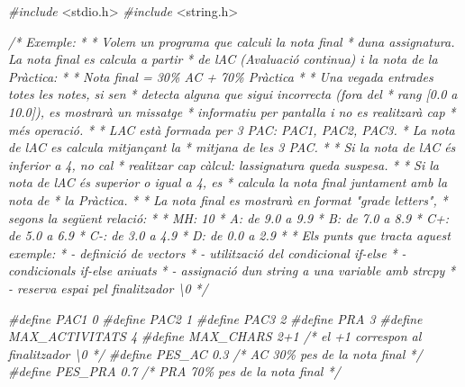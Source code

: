 \documentclass[]{book}
\newenvironment{Shaded}{\begin{snugshade}}{\end{snugshade}}
\newcommand{\CommentTok}[1]{\textcolor[rgb]{0.56,0.35,0.01}{\textit{#1}}}
\newcommand{\ImportTok}[1]{#1}
\newcommand{\PreprocessorTok}[1]{\textcolor[rgb]{0.56,0.35,0.01}{\textit{#1}}}
\begin{document}
\begin{Shaded}
\begin{Highlighting}[]
\PreprocessorTok{\#include }\ImportTok{\textless{}stdio.h\textgreater{}}
\PreprocessorTok{\#include }\ImportTok{\textless{}string.h\textgreater{}}

\CommentTok{/* Exemple:}
\CommentTok{ *}
\CommentTok{ * Volem un programa que calculi la nota final}
\CommentTok{ * d\textquotesingle{}una assignatura. La nota final es calcula a partir}
\CommentTok{ * de l\textquotesingle{}AC (Avaluació continua) i la nota de la Pràctica:}
\CommentTok{ *}
\CommentTok{ * Nota final = 30\% AC + 70\% Pràctica}
\CommentTok{ *}
\CommentTok{ * Una vegada entrades totes les notes, si se\textquotesingle{}n}
\CommentTok{ * detecta alguna que sigui incorrecta (fora del}
\CommentTok{ * rang [0.0 a 10.0]), es mostrarà un missatge}
\CommentTok{ * informatiu per pantalla i no es realitzarà cap }
\CommentTok{ * més operació.}
\CommentTok{ *}
\CommentTok{ * L\textquotesingle{}AC està formada per 3 PAC: PAC1, PAC2, PAC3. }
\CommentTok{ * La nota de l\textquotesingle{}AC es calcula mitjançant la }
\CommentTok{ * mitjana de les 3 PAC.}
\CommentTok{ *}
\CommentTok{ * Si la nota de l\textquotesingle{}AC és inferior a 4, no cal }
\CommentTok{ * realitzar cap càlcul: l\textquotesingle{}assignatura queda suspesa.}
\CommentTok{ *}
\CommentTok{ * Si la nota de l\textquotesingle{}AC és superior o igual a 4, es }
\CommentTok{ * calcula la nota final juntament amb la nota de }
\CommentTok{ * la Pràctica.}
\CommentTok{ * }
\CommentTok{ * La nota final es mostrarà en format "grade letters", }
\CommentTok{ * segons la següent relació:}
\CommentTok{ *}
\CommentTok{ * MH: 10}
\CommentTok{ * A: de 9.0 a 9.9}
\CommentTok{ * B: de 7.0 a 8.9}
\CommentTok{ * C+: de 5.0 a 6.9 }
\CommentTok{ * C{-}: de 3.0 a 4.9 }
\CommentTok{ * D: de 0.0 a 2.9}
\CommentTok{ *}
\CommentTok{ * Els punts que tracta aquest exemple:}
\CommentTok{ * {-} definició de vectors}
\CommentTok{ * {-} utilització del condicional if{-}else}
\CommentTok{ * {-} condicionals if{-}else aniuats}
\CommentTok{ * {-} assignació d\textquotesingle{}un string a una variable amb strcpy}
\CommentTok{ * {-} reserva espai pel finalitzador \textquotesingle{}\textbackslash{}0\textquotesingle{}}
\CommentTok{ */}

\PreprocessorTok{\#define PAC1 0}
\PreprocessorTok{\#define PAC2 1}
\PreprocessorTok{\#define PAC3 2}
\PreprocessorTok{\#define PRA 3}
\PreprocessorTok{\#define MAX\_ACTIVITATS 4}
\PreprocessorTok{\#define MAX\_CHARS 2+1    /* el +1 correspon al finalitzador \textquotesingle{}\textbackslash{}0\textquotesingle{} */}
\PreprocessorTok{\#define PES\_AC 0.3       }\CommentTok{/* AC 30\% pes de la nota final */}
\PreprocessorTok{\#define PES\_PRA 0.7      }\CommentTok{/* PRA 70\% pes de la nota final */}


\end{Highlighting}
\end{Shaded}
\end{document}
